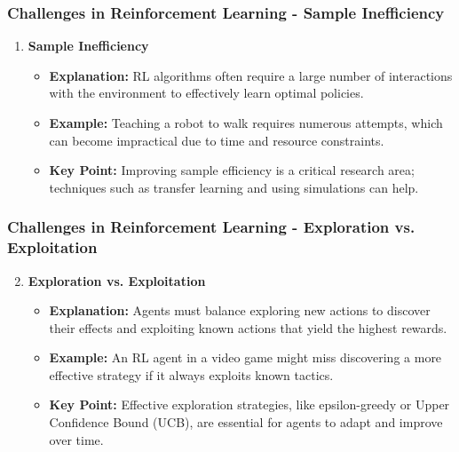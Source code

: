 \documentclass[aspectratio=169]{beamer}
\begin{document}
\begin{frame}[fragile]
    \frametitle{Challenges in Reinforcement Learning - Sample Inefficiency}
    \begin{enumerate}
        \item \textbf{Sample Inefficiency}
            \begin{itemize}
                \item \textbf{Explanation:} RL algorithms often require a large number of interactions with the environment to effectively learn optimal policies.
                \item \textbf{Example:} Teaching a robot to walk requires numerous attempts, which can become impractical due to time and resource constraints.
                \item \textbf{Key Point:} Improving sample efficiency is a critical research area; techniques such as transfer learning and using simulations can help.
            \end{itemize}
    \end{enumerate}
\end{frame}

\begin{frame}[fragile]
    \frametitle{Challenges in Reinforcement Learning - Exploration vs. Exploitation}
    \begin{enumerate}
        \setcounter{enumi}{1} %
        \item \textbf{Exploration vs. Exploitation}
            \begin{itemize}
                \item \textbf{Explanation:} Agents must balance exploring new actions to discover their effects and exploiting known actions that yield the highest rewards.
                \item \textbf{Example:} An RL agent in a video game might miss discovering a more effective strategy if it always exploits known tactics.
                \item \textbf{Key Point:} Effective exploration strategies, like epsilon-greedy or Upper Confidence Bound (UCB), are essential for agents to adapt and improve over time.
            \end{itemize}
    \end{enumerate}
\end{frame}
\end{document}
